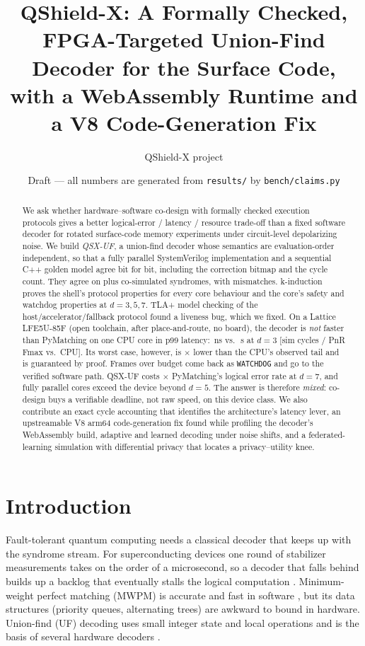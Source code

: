 \documentclass[10pt]{article}
\title{QShield-X: A Formally Checked, FPGA-Targeted Union-Find Decoder for the Surface Code,\\
with a WebAssembly Runtime and a V8 Code-Generation Fix}
\author{QShield-X project}
\date{Draft --- all numbers are generated from \texttt{results/} by \texttt{bench/claims.py}}
\newcommand{\stage}[1]{\textsf{\small[#1]}}
\begin{document}
\maketitle

\begin{abstract}
We ask whether hardware--software co-design with formally checked execution protocols gives a better
logical-error / latency / resource trade-off than a fixed software decoder for rotated surface-code memory
experiments under circuit-level depolarizing noise. We build \emph{QSX-UF}, a union-find decoder whose semantics are
evaluation-order independent, so that a fully parallel SystemVerilog implementation and a sequential C++ golden model
agree bit for bit, including the correction bitmap and the cycle count. They agree on  plus
 co-simulated syndromes, with  mismatches. k-induction proves the
shell's protocol properties for every core behaviour and the core's safety and watchdog properties at $d=3,5,7$.
TLA+ model checking of the host/accelerator/fallback protocol found a liveness bug, which we fixed. On a Lattice
LFE5U-85F (open toolchain, after place-and-route, no board), the decoder is \emph{not} faster than PyMatching on one
CPU core in p99 latency: \,ns vs.\ \,\textmu s at $d=3$
\stage{sim cycles / PnR Fmax vs.\ CPU}. Its worst case, however, is $\times$ lower than the
CPU's observed tail and is guaranteed by proof. Frames over budget come back as \texttt{WATCHDOG} and go to the
verified software path. QSX-UF costs $\times$ PyMatching's logical error rate at $d=7$, and
fully parallel cores exceed the device beyond $d=5$. The answer is therefore \emph{mixed}: co-design buys a
verifiable deadline, not raw speed, on this device class. We also contribute an exact cycle accounting that
identifies the architecture's latency lever, an upstreamable V8 arm64 code-generation fix found while profiling the
decoder's WebAssembly build, adaptive and learned decoding under noise shifts, and a federated-learning simulation
with differential privacy that locates a privacy--utility knee.
\end{abstract}

\section{Introduction}
Fault-tolerant quantum computing needs a classical decoder that keeps up with the syndrome stream.
For superconducting devices one round of stabilizer measurements takes on the order of a microsecond, so
a decoder that falls behind builds up a backlog that eventually stalls the logical computation
\cite{fowler2012,google2025below}. Minimum-weight perfect matching (MWPM) is accurate and fast in software
\cite{higgott2022pymatching,higgott2023sparse}, but its data structures (priority queues, alternating trees)
are awkward to bound in hardware. Union-find (UF) decoding \cite{delfosse2021uf} uses small integer state and
local operations and is the basis of several hardware decoders \cite{das2022afs,liyanage2023helios,barber2023realtime}.
\end{document}
